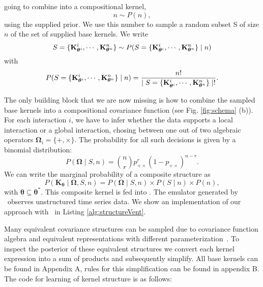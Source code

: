 going to combine into a compositional kernel,
\[
n \sim P(n),
\]
using the supplied prior. We use this number to sample a random subset S of size $n$ of
the set of supplied base kernels. We write
\[
S = \{\mathbf{K}_{\bm{\theta}^i}^i,\cdots,\mathbf{K}_{\bm{\theta}^n}^n\}
\sim P(S = \{\mathbf{K}_{\bm{\theta}^i}^i,\cdots,\mathbf{K}_{\bm{\theta}^n}^n\} \mid n) 
\]
with
\[
P(S = \{\mathbf{K}_{\bm{\theta}^i}^i,\cdots,\mathbf{K}_{\bm{\theta}^n}^n\}\mid n) = \frac{n!}{ \mid S = \{\mathbf{K}_{\bm{\theta}^i}^i,\cdots,\mathbf{K}_{\bm{\theta}^n}^n\}\mid !}.
\]

The only building block that we are now missing is how to combine the sampled
base kernels into a compositional covariance function (see Fig. \ref{fig:schema}
(b)). For each interaction $i$, we
have to infer whether the data supports a local interaction or a global interaction,
chosing between one out of two algebraic operators
$\bm{\Omega}_i=\{+,\times\}$. The probability for all such decisions is given by a binomial distribution: 
\begin{equation}
P(\bm{\Omega} \mid S,n)= {n \choose r}  p_{+\times}^r (1 - p_{+\times})^{n-r}.
\end{equation}
We can write the marginal probability of a composite structure as
\begin{equation}
P(\mathbf{K}_{\bm{\theta}} \mid \bm{\Omega},S,n) = P(\bm{\Omega} \mid S,n)\times P(S \mid n) \times P(n),
\end{equation}
with $\bm{\theta}\subseteq \bm{\theta}^*$. This  composite kernel is fed into \gpmem. 
The emulator generated by \gpmem\ observes unstructured time series data. We
show an implementation of our approach with \gpmem\ in Listing
\ref{alg:structureVent}. 








Many equivalent covariance structures can be sampled due to covariance function algebra
and equivalent representations with different parameterization~\citep{lloyd2014automatic}.
To inspect the posterior of these equivalent structures we convert each kernel expression
into a sum of products and subsequently simplify. All base kernels can be found in Appendix A,
rules for this simplification can be found in appendix B. The code for learning of kernel structure 
is as follows:

